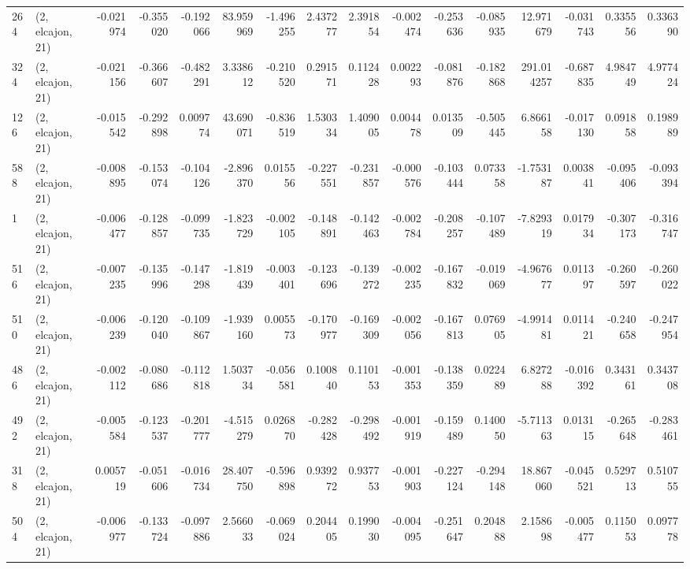 \begin{tabular}{llrrrrrrrrrrrrrr}
264 &  (2, elcajon, 21) &  -0.021974 & -0.355020 & -0.192066 &   83.959969 & -1.496255 &   2.437277 &   2.391854 & -0.002474 & -0.253636 & -0.085935 &   12.971679 & -0.031743 &   0.335556 &   0.336390 \\
324 &  (2, elcajon, 21) &  -0.021156 & -0.366607 & -0.482291 &    3.338612 & -0.210520 &   0.291571 &   0.112428 &  0.002293 & -0.081876 & -0.182868 &  291.014257 & -0.687835 &   4.984749 &   4.977424 \\
126 &  (2, elcajon, 21) &  -0.015542 & -0.292898 &  0.009774 &   43.690071 & -0.836519 &   1.530334 &   1.409005 &  0.004478 &  0.013509 & -0.505445 &    6.866158 & -0.017130 &   0.091858 &   0.198989 \\
588 &  (2, elcajon, 21) &  -0.008895 & -0.153074 & -0.104126 &   -2.896370 &  0.015556 &  -0.227551 &  -0.231857 & -0.000576 & -0.103444 &  0.073358 &   -1.753187 &  0.003841 &  -0.095406 &  -0.093394 \\
1   &  (2, elcajon, 21) &  -0.006477 & -0.128857 & -0.099735 &   -1.823729 & -0.002105 &  -0.148891 &  -0.142463 & -0.002784 & -0.208257 & -0.107489 &   -7.829319 &  0.017934 &  -0.307173 &  -0.316747 \\
516 &  (2, elcajon, 21) &  -0.007235 & -0.135996 & -0.147298 &   -1.819439 & -0.003401 &  -0.123696 &  -0.139272 & -0.002235 & -0.167832 & -0.019069 &   -4.967677 &  0.011397 &  -0.260597 &  -0.260022 \\
510 &  (2, elcajon, 21) &  -0.006239 & -0.120040 & -0.109867 &   -1.939160 &  0.005573 &  -0.170977 &  -0.169309 & -0.002056 & -0.167813 &  0.076905 &   -4.991481 &  0.011421 &  -0.240658 &  -0.247954 \\
486 &  (2, elcajon, 21) &  -0.002112 & -0.080686 & -0.112818 &    1.503734 & -0.056581 &   0.100840 &   0.110153 & -0.001353 & -0.138359 &  0.022489 &    6.827288 & -0.016392 &   0.343161 &   0.343708 \\
492 &  (2, elcajon, 21) &  -0.005584 & -0.123537 & -0.201777 &   -4.515279 &  0.026870 &  -0.282428 &  -0.298492 & -0.001919 & -0.159489 &  0.140050 &   -5.711363 &  0.013115 &  -0.265648 &  -0.283461 \\
318 &  (2, elcajon, 21) &   0.005719 & -0.051606 & -0.016734 &   28.407750 & -0.596898 &   0.939272 &   0.937753 & -0.001903 & -0.227124 & -0.294148 &   18.867060 & -0.045521 &   0.529713 &   0.510755 \\
504 &  (2, elcajon, 21) &  -0.006977 & -0.133724 & -0.097886 &    2.566033 & -0.069024 &   0.204405 &   0.199030 & -0.004095 & -0.251647 &  0.204888 &    2.158698 & -0.005477 &   0.115053 &   0.097778 \\

\end{tabular}
